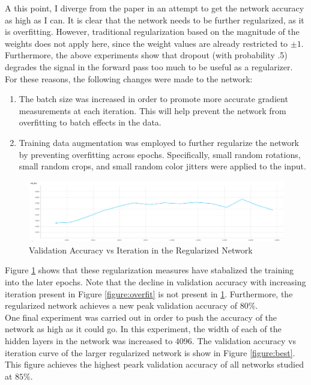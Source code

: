 \documentclass{article}
\begin{document}
    A this point, I diverge from the paper in an attempt to get the network accuracy as high as I can.
    It is clear that the network needs to be further regularized, as it is overfitting.
    However, traditional regularization based on the magnitude of the weights does not apply here, since the weight values are already restricted to $\pm 1$.
    Furthermore, the above experiments show that dropout (with probability .5) degrades the signal in the forward pass too much to be useful as a regularizer.
    For these reasons, the following changes were made to the network:
    \begin{enumerate}
      \item The batch size was increased in order to promote more accurate gradient measurements at each iteration. This will help prevent the network from overfitting to batch effects in the data.
      \item Training data augmentation was employed to further regularize the network by preventing overfitting across epochs. Specifically, small random rotations, small random crops, and small random color jitters were applied to the input.
    \end{enumerate}

    \begin{figure}[h!]
      \includegraphics[scale=.33]{img2.png}
      \caption{Validation Accuracy vs Iteration in the Regularized Network} \label{figure:fix}
    \end{figure}

    Figure \ref{figure:fix} shows that these regularization measures have stabalized the training into the later epochs.
    Note that the decline in validation accuracy with increasing iteration present in Figure \ref{figure:overfit} is not present in \ref{figure:fix}.
    Furthermore, the regularized network achieves a new peak validation accuracy of $80\%$.\\[6pt]

    One final experiment was carried out in order to push the accuracy of the network as high as it could go.
    In this experiment, the width of each of the hidden layers in the network was increased to $4096$.
    The validation accuracy vs iteration curve of the larger regularized network is show in Figure \ref{figure:best}.
    This figure achieves the highest peark validation accuracy of all networks studied at $85\%$.
\end{document}

